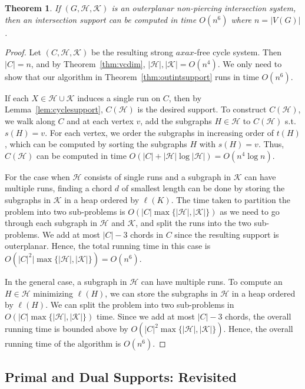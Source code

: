 \documentclass[12pt]{article}
\newcommand{\HH}{\mathcal{H}}
\newcommand{\KK}{\mathcal{K}}
\newtheorem{theorem}{Theorem}
\theoremstyle{case}
\begin{document}
\begin{theorem}\label{thm:runningtime-op}
If $(G,\HH,\KK)$ is an outerplanar non-piercing intersection system, then an intersection support can be computed in time $O(n^6)$ where $n=|V(G)|$.
\end{theorem}
\begin{proof}
Let $(C,\HH,\KK)$ be the resulting strong $axax$-free cycle system.
Then $|C|=n$, and by Theorem~\ref{thm:vcdim}, $|\HH|,|\KK|=O(n^4)$.
We only need to show that our algorithm in Theorem~\ref{thm:outintsupport} runs in time $O(n^6)$.

If each $X\in\HH\cup\KK$ induces a single run on $C$, then by Lemma~\ref{lem:cyclesupport}, $C(\HH)$ is the desired support.
To construct $C(\HH)$, we walk along $C$ and at each vertex $v$, add the subgraphs $H\in\HH$ to $C(\HH)$
s.t. $s(H)=v$.
For each vertex, we order the subgraphs in increasing order of $t(H)$, which can be computed by
sorting the subgraphs $H$ with $s(H)=v$.
Thus, $C(\HH)$ can be computed in time $O(|C| + |\mathcal{H}|\log|\mathcal{H}|)=O(n^4\log{n})$.

For the case when $\HH$ consists of single runs and a subgraph in $\KK$ can have multiple runs, finding a chord $d$ of smallest length can be done by storing
the subgraphs in $\mathcal{K}$ in a heap ordered by $\ell(K)$.
The time taken to partition the problem into two sub-problems is
$O(|C|\max\{|\mathcal{H}|,|\mathcal{K}|\})$
as we need to go through each subgraph in $\mathcal{H}$ and $\mathcal{K}$, and split the runs into the two sub-problems. 
We add at most $|C|-3$ chords in $C$ since the resulting support is outerplanar.
Hence, the
total running time in this case is $O(|C|^2|\max\{|\mathcal{H}|,|\mathcal{K}|\})
= O(n^6)$.

In the general case, a subgraph in $\HH$ can have multiple runs.
To compute an $H\in\mathcal{H}$
minimizing $\ell(H)$, we can store the subgraphs in $\mathcal{H}$
in a heap ordered by $\ell(H)$. We can split the problem into
two sub-problems in $O(|C|\max\{|\mathcal{H}|,|\mathcal{K}|\})$
time. Since we add at most $|C|-3$ chords, the overall running time
is bounded above by $O(|C|^2\max\{|\mathcal{H}|,|\mathcal{K}|\})$.
Hence, the overall running time of the algorithm is $O(n^6)$.
\end{proof}

\subsection{Primal and Dual Supports: Revisited}
\label{sec:ababfree}
\end{document}
